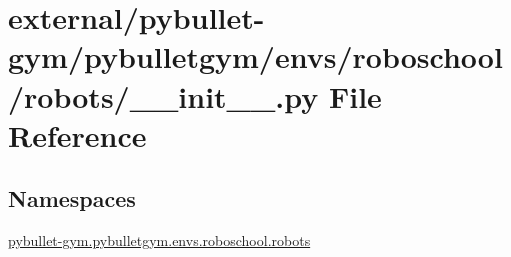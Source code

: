 \hypertarget{external_2pybullet-gym_2pybulletgym_2envs_2roboschool_2robots_2____init_____8py}{}\section{external/pybullet-\/gym/pybulletgym/envs/roboschool/robots/\+\_\+\+\_\+init\+\_\+\+\_\+.py File Reference}
\label{external_2pybullet-gym_2pybulletgym_2envs_2roboschool_2robots_2____init_____8py}
\subsection*{Namespaces}
\begin{DoxyCompactItemize}
\item 
 \hyperlink{namespacepybullet-gym_1_1pybulletgym_1_1envs_1_1roboschool_1_1robots}{pybullet-\/gym.\+pybulletgym.\+envs.\+roboschool.\+robots}
\end{DoxyCompactItemize}

